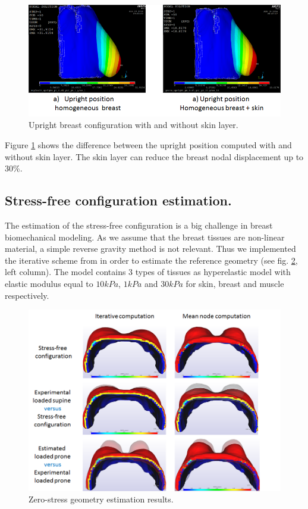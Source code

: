 \begin{center}			  
\begin{figure}[h]
\centerline{\includegraphics[scale=0.7]{figures/upright-position.png} }
\caption{Upright breast configuration with and without skin layer.}
\label{upright}
\end{figure}
\end{center}

Figure \ref{upright} shows the difference between the upright position computed with and without skin layer. The skin layer can reduce the breast nodal displacement up to 30\%. 

\subsection{Stress-free configuration estimation.}
The estimation of the stress-free configuration is a big challenge in breast biomechanical modeling. As we assume that the breast tissues are non-linear material, a simple reverse gravity method is not relevant. Thus we implemented the iterative scheme from \cite{carter_determining_2009} in order to estimate the reference geometry (see fig. \ref{iterativeRG}, left column). The model contains 3 types of tissues as hyperelastic model with elastic modulus equal to $10kPa$, $1kPa$ and $30kPa$ for skin, breast and muscle respectively.  

\begin{center}			  
\begin{figure}[h]
\centerline{\includegraphics[scale=0.8]{figures/iterativeVsMean.png} }
\caption{Zero-stress geometry estimation results.  }
\label{iterativeRG}
\end{figure}
\end{center}


